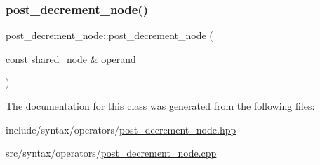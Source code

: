 \subsubsection{\texorpdfstring{post\+\_\+decrement\+\_\+node()}{post\_decrement\_node()}}
{\footnotesize\ttfamily post\+\_\+decrement\+\_\+node\+::post\+\_\+decrement\+\_\+node (\begin{DoxyParamCaption}\item[{const \hyperlink{namespacejawe_a3f307481d921b6cbb50cc8511fc2b544}{shared\+\_\+node} \&}]{operand }\end{DoxyParamCaption})}



The documentation for this class was generated from the following files\+:\begin{DoxyCompactItemize}
\item 
include/syntax/operators/\hyperlink{post__decrement__node_8hpp}{post\+\_\+decrement\+\_\+node.\+hpp}\item 
src/syntax/operators/\hyperlink{post__decrement__node_8cpp}{post\+\_\+decrement\+\_\+node.\+cpp}\end{DoxyCompactItemize}
